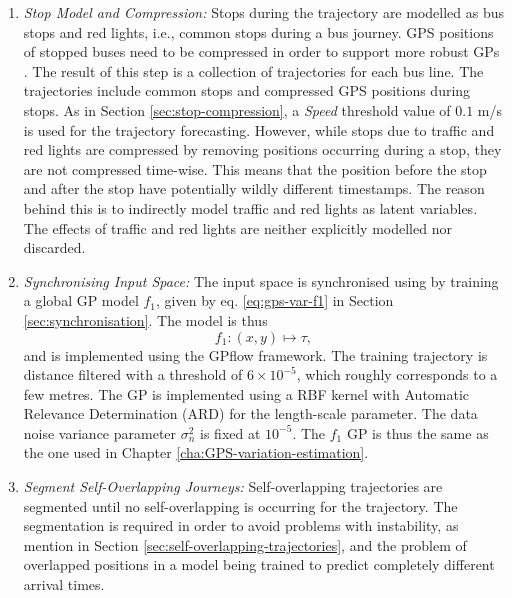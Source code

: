 \begin{enumerate}
    \item \textit{Stop Model and Compression:}
    Stops during the trajectory are modelled as bus stops and red lights, i.e., common stops during a bus journey.
    GPS positions of stopped buses need to be compressed in order to support more robust GPs \cite{Tiger2018-gp-motion-pattern}.
    The result of this step is a collection of trajectories for each bus line.
    The trajectories include common stops and compressed GPS positions during stops.
    As in Section \ref{sec:stop-compression}, a \textit{Speed} threshold value of $0.1$ m/s is used for the trajectory forecasting.
    However, while stops due to traffic and red lights are compressed by removing positions occurring during a stop, they are not compressed time-wise.
    This means that the position before the stop and after the stop have potentially wildly different timestamps.
    The reason behind this is to indirectly model traffic and red lights as latent variables.
    The effects of traffic and red lights are neither explicitly modelled nor discarded.

    \item \textit{Synchronising Input Space:}
    The input space is synchronised using by training a global GP model $f_1$, given by eq. \ref{eq:gps-var-f1} in Section \ref{sec:synchronisation}.
    The model is thus
    \begin{equation} \label{eq:gps-var-f1}
        f_1: (x, y) \longmapsto \tau,
    \end{equation}
    and is implemented using the GPflow \cite{GPflow2017} framework.
    The training trajectory is distance filtered with a threshold of $6 \times 10^{-5}$, which roughly corresponds to a few metres.
    The GP is implemented using a RBF kernel with Automatic Relevance Determination (ARD) for the length-scale parameter.
    The data noise variance parameter $\sigma^2_n$ is fixed at $10^{-5}$.
    The $f_1$ GP is thus the same as the one used in Chapter \ref{cha:GPS-variation-estimation}.

    \item \textit{Segment Self-Overlapping Journeys:}
    Self-overlapping trajectories are segmented until no self-overlapping is occurring for the trajectory.
    The segmentation is required in order to avoid problems with instability, as mention in Section \ref{sec:self-overlapping-trajectories}, and the problem of overlapped positions in a model being trained to predict completely different arrival times.


\end{enumerate}
